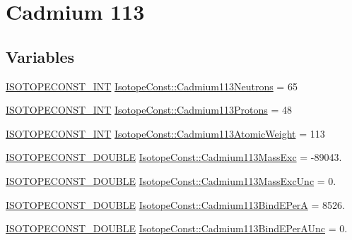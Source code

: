 \hypertarget{group___isotope_const-_cadmium-_cd113}{}\section{Cadmium 113}
\label{group___isotope_const-_cadmium-_cd113}
\subsection*{Variables}
\begin{DoxyCompactItemize}
\item 
\mbox{\hyperlink{group___isotope_const-_macros_ga5f18360b3e99483a35c32d789e62621c}{I\+S\+O\+T\+O\+P\+E\+C\+O\+N\+S\+T\+\_\+\+I\+NT}} \mbox{\hyperlink{group___isotope_const-_cadmium-_cd113_gab965a31598178d6036178b90a4ccba12}{Isotope\+Const\+::\+Cadmium113\+Neutrons}} = 65
\item 
\mbox{\hyperlink{group___isotope_const-_macros_ga5f18360b3e99483a35c32d789e62621c}{I\+S\+O\+T\+O\+P\+E\+C\+O\+N\+S\+T\+\_\+\+I\+NT}} \mbox{\hyperlink{group___isotope_const-_cadmium-_cd113_ga918b8fc80c34c7f866ca292e0e08522b}{Isotope\+Const\+::\+Cadmium113\+Protons}} = 48
\item 
\mbox{\hyperlink{group___isotope_const-_macros_ga5f18360b3e99483a35c32d789e62621c}{I\+S\+O\+T\+O\+P\+E\+C\+O\+N\+S\+T\+\_\+\+I\+NT}} \mbox{\hyperlink{group___isotope_const-_cadmium-_cd113_gae4f4526923aef903eedf92b88b80942b}{Isotope\+Const\+::\+Cadmium113\+Atomic\+Weight}} = 113
\item 
\mbox{\hyperlink{group___isotope_const-_macros_ga8f45a7272ce02c0b4c65c44636ed719a}{I\+S\+O\+T\+O\+P\+E\+C\+O\+N\+S\+T\+\_\+\+D\+O\+U\+B\+LE}} \mbox{\hyperlink{group___isotope_const-_cadmium-_cd113_ga12c6818358fb10cccaa1549f4bd63967}{Isotope\+Const\+::\+Cadmium113\+Mass\+Exc}} = -\/89043.
\item 
\mbox{\hyperlink{group___isotope_const-_macros_ga8f45a7272ce02c0b4c65c44636ed719a}{I\+S\+O\+T\+O\+P\+E\+C\+O\+N\+S\+T\+\_\+\+D\+O\+U\+B\+LE}} \mbox{\hyperlink{group___isotope_const-_cadmium-_cd113_gaf8c15605434aad5c530f083f451b42e7}{Isotope\+Const\+::\+Cadmium113\+Mass\+Exc\+Unc}} = 0.
\item 
\mbox{\hyperlink{group___isotope_const-_macros_ga8f45a7272ce02c0b4c65c44636ed719a}{I\+S\+O\+T\+O\+P\+E\+C\+O\+N\+S\+T\+\_\+\+D\+O\+U\+B\+LE}} \mbox{\hyperlink{group___isotope_const-_cadmium-_cd113_ga12151a95effa4bd30891f84ce5302bc2}{Isotope\+Const\+::\+Cadmium113\+Bind\+E\+PerA}} = 8526.
\item 
\mbox{\hyperlink{group___isotope_const-_macros_ga8f45a7272ce02c0b4c65c44636ed719a}{I\+S\+O\+T\+O\+P\+E\+C\+O\+N\+S\+T\+\_\+\+D\+O\+U\+B\+LE}} \mbox{\hyperlink{group___isotope_const-_cadmium-_cd113_ga5f6c245643d5ef0c3abb76991503d203}{Isotope\+Const\+::\+Cadmium113\+Bind\+E\+Per\+A\+Unc}} = 0.

\end{DoxyCompactItemize}
